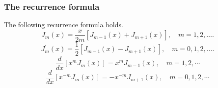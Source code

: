 \subsubsection{The recurrence formula}
\begin{proposition}[]
The following recurrence formula holds.
\begin{equation}\label{eq.Bessel_recursion_1}
    J_m(x)=\frac{x}{2 m}\left[J_{m-1}(x)+J_{m+1}(x)\right], \quad m=1,2, \ldots .
\end{equation}
\begin{equation}\label{eq.Bessel_recursion_2}
    J_m^{\prime}(x)=\frac{1}{2}\left[J_{m-1}(x)-J_{m+1}(x)\right], \quad m=0,1,2, \ldots .
\end{equation}
\begin{equation}\label{eq.Bessel_recursion_3}
    \frac{d}{d x}\left[x^m J_m(x)\right]=x^m J_{m-1}(x), \quad m=1,2, \cdots
\end{equation}
\begin{equation}\label{eq.Bessel_recursion_4}
    \frac{d}{d x}\left[x^{-m} J_m(x)\right]=-x^{-m} J_{m+1}(x), \quad m=0,1,2, \cdots
\end{equation}
\end{proposition}

